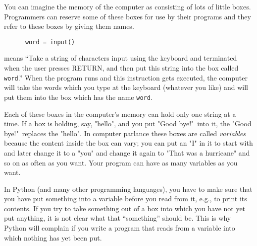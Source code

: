 You can imagine the memory of the computer as consisting of lots of
little boxes.  Programmers can reserve some of these boxes for
use by their programs and they refer to these boxes by giving
them names.  

\begin{Verbatim}
      word = input()
\end{Verbatim}

means ``Take a string of characters input using the keyboard and
terminated when the user presses RETURN, and
then put this string into the box called \verb!word!.''  When the program runs and
this instruction gets executed, the computer will take the words which
you type at the keyboard (whatever you like) and will put them into
the box which has the name \verb!word!.

Each of these boxes in the computer's memory can hold only one string at a time.  If a box is
holding, say, "hello", and you put "Good bye!"\ into it, the
"Good bye!"\ replaces the "hello".  In computer parlance these
boxes are called \emph{variables} because the content inside the box
can vary; you can put an "I" in it to start with and later change it
to a "you" and change it again to "That was a hurricane" and so on
as often as you want.
Your program can have as many variables as you want.


%
%
%
%
%
In Python (and many other programming languages), you have to make sure
that you have put something into a variable before you read from it,
e.g., to print its contents. If you try to take something out of a box
into which you have not yet put anything, it is not clear what that
``something'' should be. This is why Python will complain if you write
a program that reads from a variable into which nothing has yet been put.


